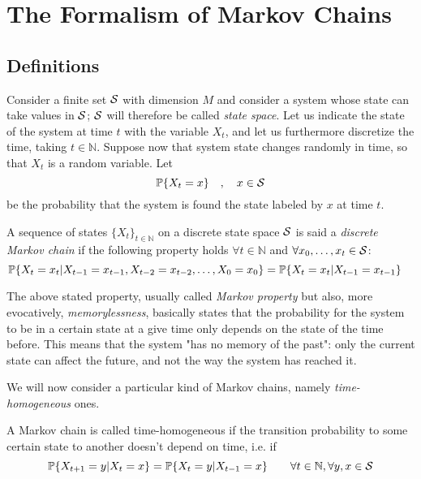 \chapter{The Formalism of Markov Chains}
\label{ch:markov_chains}
\section{Definitions}
Consider a finite set $\mathcal{S}$ with dimension $M$ and consider a system whose state can take values in $\mathcal{S}$; $\mathcal{S}$ will therefore be called \emph{state space}. Let us indicate the state of the system at time $t$ with the variable $X_t$, and let us furthermore discretize the time, taking $t \in \mathbb{N}$. Suppose now that system state changes randomly in time, so that $X_t$ is a random variable. Let
\begin{equation}
    \mathbb{P}\{X_t = x\} \quad , \quad x \in \mathcal{S}
\end{equation}
be the probability that the system is found the state labeled by $x$ at time $t$.

\begin{ndef}  \label{def:markov-chain}
    A sequence of states $\{X_t\}_{t\in \mathbb{N}}$ on a discrete state space $\mathcal{S}$ is said a \emph{discrete Markov chain} if the following property holds $\forall t \in \mathbb N$ and $\forall x_0, \dots, x_t \in \mathcal{S}$:
    \begin{equation}
        \mathbb{P}\{ X_t = x_t | X_{t-1} = x_{t-1}, X_{t-2} = x_{t-2}, \dots, X_0 = x_0 \} = \mathbb{P}\{ X_t = x_t | X_{t-1} = x_{t-1} \} \quad
    \end{equation}
\end{ndef}

The above stated property, usually called \emph{Markov property} but also, more evocatively, \emph{memorylessness}, basically states that the probability for the system to be in a certain state at a give time only depends on the state of the time before. This means that the system "has no memory of the past": only the current state can affect the future, and not the way the system has reached it.

\smallskip
We will now consider a particular kind of Markov chains, namely \emph{time-homogeneous} ones.
\begin{ndef}  A Markov chain is called time-homogeneous if the transition probability to some certain state to another doesn't depend on time, i.e. if
    \begin{equation}
        \mathbb{P}\{X_{t+1} = y | X_{t} = x\} = \mathbb{P}\{X_{t} = y | X_{t-1} = x\} \quad \quad \forall t\in \mathbb{N}, \forall y, x \in \mathcal{S}
    \end{equation}
\end{ndef}

